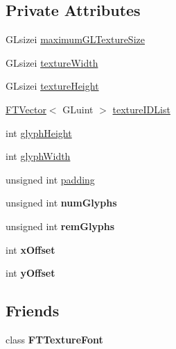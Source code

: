 \subsection*{Private Attributes}
\begin{DoxyCompactItemize}
\item 
G\+Lsizei \hyperlink{class_f_t_texture_font_impl_a4c7ad20df5b4a840d8f0276ac0935544}{maximum\+G\+L\+Texture\+Size}
\item 
G\+Lsizei \hyperlink{class_f_t_texture_font_impl_a997a027dbc2b7f96b2dd0bac9b38a3c5}{texture\+Width}
\item 
G\+Lsizei \hyperlink{class_f_t_texture_font_impl_a05a16bd4c554cfc6623d9129a7bfe70e}{texture\+Height}
\item 
\hyperlink{class_f_t_vector}{F\+T\+Vector}$<$ G\+Luint $>$ \hyperlink{class_f_t_texture_font_impl_a79903b5dd7fefd31ba092f3d32bdffc1}{texture\+I\+D\+List}
\item 
int \hyperlink{class_f_t_texture_font_impl_a037c4ba87483331316b234d4396401f8}{glyph\+Height}
\item 
int \hyperlink{class_f_t_texture_font_impl_a3defaf55764984ae344e0ff7d467fe27}{glyph\+Width}
\item 
unsigned int \hyperlink{class_f_t_texture_font_impl_ab8b4d2241f395e2abe0c287b40ab5726}{padding}
\item 
unsigned int {\bfseries num\+Glyphs}\hypertarget{class_f_t_texture_font_impl_a568b1f209b75fc4d6d270dbc8f648f81}{}\label{class_f_t_texture_font_impl_a568b1f209b75fc4d6d270dbc8f648f81}

\item 
unsigned int {\bfseries rem\+Glyphs}\hypertarget{class_f_t_texture_font_impl_a7a249763c1042cafa4ec6f071dfb6b39}{}\label{class_f_t_texture_font_impl_a7a249763c1042cafa4ec6f071dfb6b39}

\item 
int {\bfseries x\+Offset}\hypertarget{class_f_t_texture_font_impl_a9a895eee54ed82ae35850676b6abe5d2}{}\label{class_f_t_texture_font_impl_a9a895eee54ed82ae35850676b6abe5d2}

\item 
int {\bfseries y\+Offset}\hypertarget{class_f_t_texture_font_impl_a196d6dd20b1aa070a5da9d2dd31b5262}{}\label{class_f_t_texture_font_impl_a196d6dd20b1aa070a5da9d2dd31b5262}

\end{DoxyCompactItemize}
\subsection*{Friends}
\begin{DoxyCompactItemize}
\item 
class {\bfseries F\+T\+Texture\+Font}\hypertarget{class_f_t_texture_font_impl_a7870c341f7269dfae257e93406c17c92}{}\label{class_f_t_texture_font_impl_a7870c341f7269dfae257e93406c17c92}

\end{DoxyCompactItemize}
